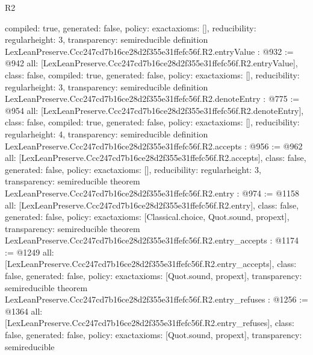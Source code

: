 \begin{lexlean}{R2}
\begin{coremodule}
{  compiled: true,
  generated: false,
  policy: exact{axioms: []},
  reducibility: regular{height: 3},
  transparency: semireducible
}
definition LexLeanPreserve.Ccc247cd7b16ce28d2f355e31ffefc56f.R2.entryValue : @932 := @942 {
  all: [LexLeanPreserve.Ccc247cd7b16ce28d2f355e31ffefc56f.R2.entryValue],
  class: false,
  compiled: true,
  generated: false,
  policy: exact{axioms: []},
  reducibility: regular{height: 3},
  transparency: semireducible
}
definition LexLeanPreserve.Ccc247cd7b16ce28d2f355e31ffefc56f.R2.denoteEntry : @775 := @954 {
  all: [LexLeanPreserve.Ccc247cd7b16ce28d2f355e31ffefc56f.R2.denoteEntry],
  class: false,
  compiled: true,
  generated: false,
  policy: exact{axioms: []},
  reducibility: regular{height: 4},
  transparency: semireducible
}
definition LexLeanPreserve.Ccc247cd7b16ce28d2f355e31ffefc56f.R2.accepts : @956 := @962 {
  all: [LexLeanPreserve.Ccc247cd7b16ce28d2f355e31ffefc56f.R2.accepts],
  class: false,
  generated: false,
  policy: exact{axioms: []},
  reducibility: regular{height: 3},
  transparency: semireducible
}
theorem LexLeanPreserve.Ccc247cd7b16ce28d2f355e31ffefc56f.R2.entry : @974 := @1158 {
  all: [LexLeanPreserve.Ccc247cd7b16ce28d2f355e31ffefc56f.R2.entry],
  class: false,
  generated: false,
  policy: exact{axioms: [Classical.choice, Quot.sound, propext]},
  transparency: semireducible
}
theorem LexLeanPreserve.Ccc247cd7b16ce28d2f355e31ffefc56f.R2.entry_accepts : @1174 := @1249 {
  all: [LexLeanPreserve.Ccc247cd7b16ce28d2f355e31ffefc56f.R2.entry_accepts],
  class: false,
  generated: false,
  policy: exact{axioms: [Quot.sound, propext]},
  transparency: semireducible
}
theorem LexLeanPreserve.Ccc247cd7b16ce28d2f355e31ffefc56f.R2.entry_refuses : @1256 := @1364 {
  all: [LexLeanPreserve.Ccc247cd7b16ce28d2f355e31ffefc56f.R2.entry_refuses],
  class: false,
  generated: false,
  policy: exact{axioms: [Quot.sound, propext]},
  transparency: semireducible
}


\end{coremodule}
\end{lexlean}
